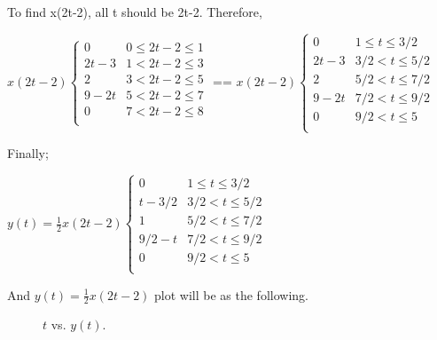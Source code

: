 \documentclass[10pt,a4paper, margin=1in]{article}
\begin{document}
\begin{enumerate}
To find x(2t-2), all t should be 2t-2. Therefore,
\vspace{0.25cm}

$
x(2t-2)
\begin{cases} 
      0 & 0 \leq 2t-2 \leq 1 \\
      2t-3 & 1 < 2t-2 \leq 3 \\
      2 & 3 < 2t-2 \leq 5 \\
      9-2t & 5 < 2t-2 \leq 7 \\
      0 & 7 < 2t-2 \leq 8 \\
   \end{cases}
$
==
$
x(2t-2)
\begin{cases} 
      0 & 1 \leq t \leq 3/2 \\
      2t-3 & 3/2 < t \leq 5/2 \\
      2 & 5/2 < t \leq 7/2 \\
      9-2t & 7/2 < t \leq 9/2 \\
      0 & 9/2 < t \leq 5 \\
   \end{cases}
$
\vspace{0.25cm}

Finally;

$
y(t) = \frac{1}{2}x(2t-2)
\begin{cases} 
      0 & 1 \leq t \leq 3/2 \\
      t-3/2 & 3/2 < t \leq 5/2 \\
      1 & 5/2 < t \leq 7/2 \\
      9/2-t & 7/2 < t \leq 9/2 \\
      0 & 9/2 < t \leq 5 \\
   \end{cases}
$
\vspace{0.25cm}

And $y(t) = \frac{1}{2}x(2t-2)$ plot will be as the following.

\begin{figure}[h!]
    \centering
        \caption{$t$ vs. $ y(t) $.}
        \label{fig:q2}
    \end{figure}


\end{enumerate}
\end{document}
